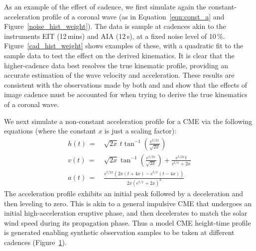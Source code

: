 \documentclass[structabstract]{aa}
\begin{document}
\begin{figure}[!ht]
\caption{}
\label{fig_cadence_hva}
\end{figure}

As an example of the effect of cadence, we first simulate again the constant-acceleration profile of a coronal wave (as in Equation~\ref{eqn:const_a} and Figure~\ref{noise_hist_weight}). The data is sample at cadences akin to the instruments EIT (12\,mins) and AIA (12\,s), at a fixed noise level of 10\,\%. Figure~\ref{cad_hist_weight} shows examples of these, with a quadratic fit to the sample data to test the effect on the derived kinematics. It is clear that the higher-cadence data best resolves the true kinematic profile, providing an accurate estimation of the wave velocity and acceleration. These results are consistent with the observations made by both \citet{2008ApJ...680L..81L} and \citet{2009ApJ...707..503M} and show that the effects of image cadence must be accounted for when trying to derive the true kinematics of a coronal wave.


We next simulate a non-constant acceleration profile for a CME via the following equations (where the constant $x$ is just a scaling factor):
\begin{eqnarray}
h(t)\,=&\,\sqrt{2x}\,t\tan^{-1}\left(\frac{e^{t/2x}}{\sqrt{2x}}\right) \\
v(t)\,=&\,\sqrt{2x}\tan^{-1}\left(\frac{e^{t/2x}}{\sqrt{2x}}\right)+\frac{e^{t/2x}t}{e^{t/x}+2x} \\
a(t)\,=&\,\frac{e^{t/2x}\left(2x\left(t+4x\right)-e^{t/x}\left(t-4x\right)\right)}{2x\left(e^{t/x}+2x\right)^2}
\label{eqn:nonconst_a}
\end{eqnarray}
The acceleration profile exhibits an initial peak followed by a deceleration and then leveling to zero. This is akin to a general impulsive CME that undergoes an initial high-acceleration eruptive phase, and then decelerates to match the solar wind speed during its propagation phase. Thus a model CME height-time profile is generated enabling synthetic observation samples to be taken at different cadences (Figure~\ref{fig_cadence_hva}). 
\end{document}
